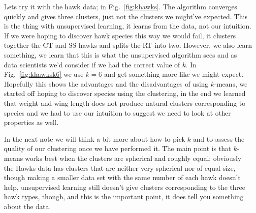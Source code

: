 \documentclass[12pt]{article}
\begin{document}
Lets try it with the hawk data; in Fig.~\ref{fig:khawks}. The
algorithm converges quickly and gives three clusters, just not the
clusters we might've expected. This is the thing with unsupervised
learning, it learns from the data, not our intuition. If we were
hoping to discover hawk species this way we would fail, it clusters
together the CT and SS hawks and splits the RT into two. However, we
also learn something, we learn that this is what the unsupervised
algorithm sees and as data scientists we'd consider if we had the
correct value of $k$. In Fig.~\ref{fig:khawksk6} we use $k=6$ and get
something more like we might expect. Hopefully this shows the
advantages and the disadvantages of using $k$-means, we started off
hoping to discover species using the clustering, in the end we learned
that weight and wing length does not produce natural clusters
corresponding to species and we had to use our intuition to suggest we
need to look at other properties as well.

In the next note we will think a bit more about how to pick $k$ and to
assess the quality of our clustering once we have performed it. The
main point is that $k$-means works best when the clusters are
spherical and roughly equal; obviously the Hawks data has clusters
that are neither very spherical nor of equal size, though making a
smaller data set with the same number of each hawk doesn't help,
unsupervised learning still doesn't give clusters corresponding to the
three hawk types, though, and this is the important point, it does
tell you something about the data.
\end{document}
